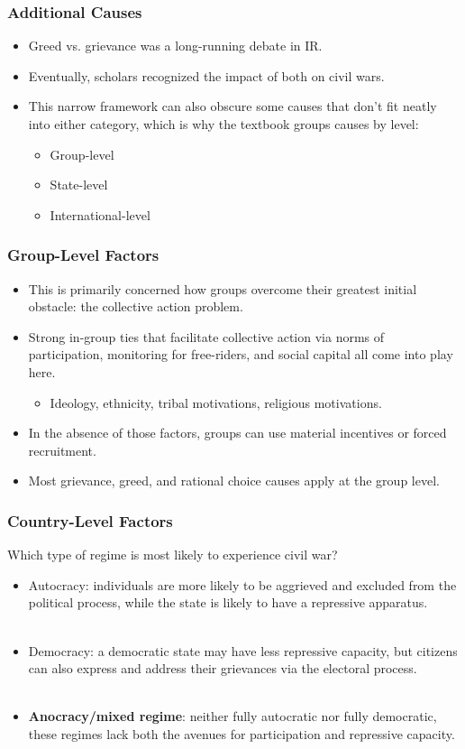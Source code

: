 \documentclass{beamer}
\begin{document}
\begin{frame} 
	\frametitle{\LARGE{Additional Causes}}
	\begin{itemize}
		\item Greed vs. grievance was a long-running debate in IR. \pause
		\item Eventually, scholars recognized the impact of both on civil wars. \pause
		\item This narrow framework can also obscure some causes that don't fit neatly into either category, which is why the textbook groups causes by level:
		\begin{itemize}
			\item Group-level
			\item State-level
			\item International-level
		\end{itemize} 
	\end{itemize}
\end{frame}

\begin{frame} 
\frametitle{\LARGE{Group-Level Factors}}
\begin{itemize}
		\item This is primarily concerned how groups overcome their greatest initial obstacle: the collective action problem. \pause
		\item Strong in-group ties that facilitate collective action via norms of participation, monitoring for free-riders, and social capital all come into play here. \pause
		\begin{itemize}
		\item Ideology, ethnicity, tribal motivations, religious motivations. \pause 
		\end{itemize}
		\item In the absence of those factors, groups can use material incentives or forced recruitment. \pause
		\item Most grievance, greed, and rational choice causes apply at the group level.		
\end{itemize}
\end{frame}

\begin{frame} 
\frametitle{\LARGE{Country-Level Factors}}
 Which type of regime is most likely to experience civil war?\pause
\begin{itemize}
		\item Autocracy: individuals are more likely to be aggrieved and excluded from the political process, while the state is likely to have a repressive apparatus. \pause
		\\~\\
		\item Democracy: a democratic state may have less repressive capacity, but citizens can also express and address their grievances via the electoral process. \pause 
		\\~\\
		\item \textbf{Anocracy/mixed regime}: neither fully autocratic nor fully democratic, these regimes lack both the avenues for participation and repressive capacity.
\end{itemize}
\end{frame}
\end{document}
